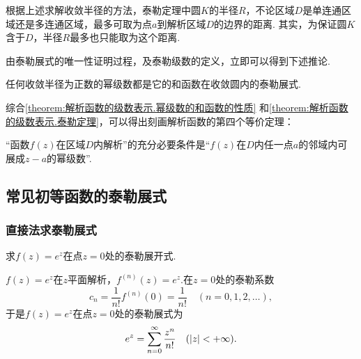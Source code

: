 根据上述求解收敛半径的方法，泰勒定理中圆\(K\)的半径\(R\)，不论区域\(D\)是单连通区域还是多连通区域，最多可取为点\(a\)到解析区域\(D\)的边界的距离.
其实，为保证圆\(K\)含于\(D\)，半径\(R\)最多也只能取为这个距离.

由泰勒展式的唯一性证明过程，及泰勒级数的定义，立即可以得到下述推论.
\begin{corollary}
任何收敛半径为正数的幂级数都是它的和函数在收敛圆内的泰勒展式.
\end{corollary}

综合\cref{theorem:解析函数的级数表示.幂级数的和函数的性质} 和\cref{theorem:解析函数的级数表示.泰勒定理}，可以得出刻画解析函数的第四个等价定理：
\begin{theorem}
“函数\(f(z)\)在区域\(D\)内解析”的充分必要条件是“\(f(z)\)在\(D\)内任一点\(a\)的邻域内可展成\(z-a\)的幂级数”.
\end{theorem}

\subsection{常见初等函数的泰勒展式}
\subsubsection{直接法求泰勒展式}
\begin{example}
求\(f(z) = e^z\)在点\(z = 0\)处的泰勒展开式.
\begin{solution}
\(f(z) = e^z\)在\(z\)平面解析，\(f^{(n)}(z) = e^z\).在\(z = 0\)处的泰勒系数\[
c_n = \frac{1}{n!} f^{(n)}(0) = \frac{1}{n!}
\quad(n=0,1,2,\dotsc),
\]于是\(f(z) = e^z\)在点\(z = 0\)处的泰勒展式为\begin{equation}\label{equation:解析函数的级数表示.指数函数的泰勒展式}
e^z = \sum_{n=0}^\infty \frac{z^n}{n!}
\quad(\abs{z} < +\infty).
\end{equation}
\end{solution}
\end{example}

